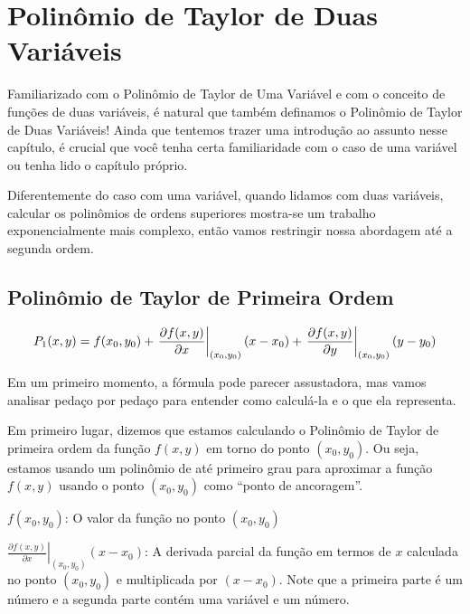 \documentclass[
  letterpaper,
  DIV=11,
  numbers=noendperiod]{scrreprt}
\begin{document}
\chapter{}\label{section}

\chapter{Polinômio de Taylor de Duas
Variáveis}\label{polinuxf4mio-de-taylor-de-duas-variuxe1veis}

\newcommand{\pt}[3]{\frac{\partial^2{#1}}{\partial{#2}\partial{#3}}}
\newcommand{\ptd}[3]{\left. \frac{\partial^2{#1}}{\partial{#2}\partial{#3}} \right \rvert_{(x_0,y_0)}}

Familiarizado com o Polinômio de Taylor de Uma Variável e com o conceito
de funções de duas variáveis, é natural que também definamos o Polinômio
de Taylor de Duas Variáveis! Ainda que tentemos trazer uma introdução ao
assunto nesse capítulo, é crucial que você tenha certa familiaridade com
o caso de uma variável ou tenha lido o capítulo próprio.

Diferentemente do caso com uma variável, quando lidamos com duas
variáveis, calcular os polinômios de ordens superiores mostra-se um
trabalho exponencialmente mais complexo, então vamos restringir nossa
abordagem até a segunda ordem.

\section{Polinômio de Taylor de Primeira
Ordem}\label{polinuxf4mio-de-taylor-de-primeira-ordem}

\[
P_1(x,y) = f(x_0, y_0) + 
\left. \frac{\partial f(x,y)}{\partial x} \right |_{(x_0,y_0)} (x-x_0) +
\left. \frac{\partial f(x,y)}{\partial y} \right |_{(x_0,y_0)} (y-y_0) \\
\]

Em um primeiro momento, a fórmula pode parecer assustadora, mas vamos
analisar pedaço por pedaço para entender como calculá-la e o que ela
representa.

Em primeiro lugar, dizemos que estamos calculando o Polinômio de Taylor
de primeira ordem da função \(f(x,y)\) em torno do ponto \((x_0,y_0)\).
Ou seja, estamos usando um polinômio de até primeiro grau para aproximar
a função \(f(x,y)\) usando o ponto \((x_0,y_0)\) como ``ponto de
ancoragem''.

\(f(x_0,y_0)\): O valor da função no ponto \((x_0, y_0)\)

\(\left. \frac{\partial f(x,y)}{\partial x} \right |_{(x_0,y_0)} (x-x_0)\):
A derivada parcial da função em termos de \(x\) calculada no ponto
\((x_0, y_0)\) e multiplicada por \((x-x_0)\). Note que a primeira parte
é um número e a segunda parte contém uma variável e um número.
\end{document}
